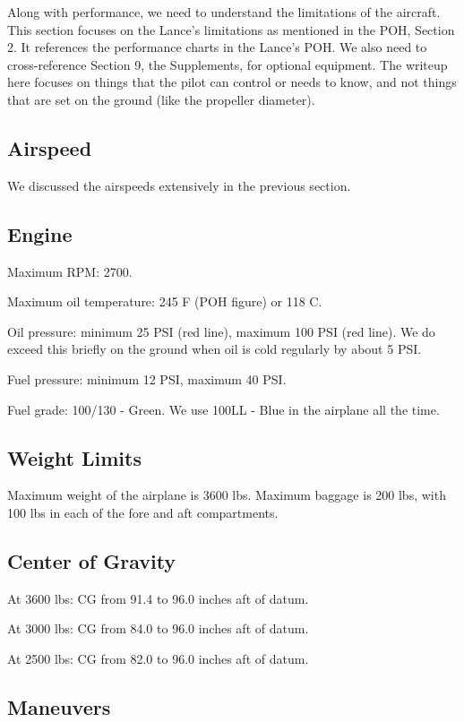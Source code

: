 Along with performance, we need to understand the limitations of the aircraft. This section focuses on the Lance's limitations as mentioned in the POH, Section 2. It references the performance charts in the Lance's POH. We also need to cross-reference Section 9, the Supplements, for optional equipment. The writeup here focuses on things that the pilot can control or needs to know, and not things that are set on the ground (like the propeller diameter).

\subsection{Airspeed}

We discussed the airspeeds extensively in the previous section.

\subsection{Engine}

Maximum RPM: 2700.

Maximum oil temperature: 245 F (POH figure) or 118 C.

Oil pressure: minimum 25 PSI (red line), maximum 100 PSI (red line). We do exceed this briefly on the ground when oil is cold regularly by about 5 PSI.

Fuel pressure: minimum 12 PSI, maximum 40 PSI.

Fuel grade: 100/130 - Green. We use 100LL - Blue in the airplane all the time.

\subsection{Weight Limits}

Maximum weight of the airplane is 3600 lbs. Maximum baggage is 200 lbs, with 100 lbs in each of the fore and aft compartments.

\subsection{Center of Gravity}

At 3600 lbs: CG from 91.4 to 96.0 inches aft of datum.

At 3000 lbs: CG from 84.0 to 96.0 inches aft of datum.

At 2500 lbs: CG from 82.0 to 96.0 inches aft of datum.

\subsection{Maneuvers}


